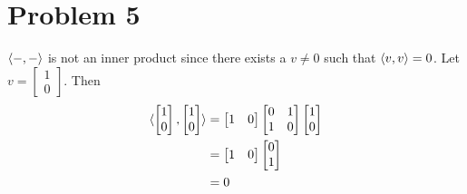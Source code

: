 \section*{Problem 5}
$\langle -, - \rangle$ is not an inner product since 
there exists a $v \neq 0$ such that $\langle v, v \rangle = 0$.
Let $v = \begin{bmatrix} 1 \\ 0 \end{bmatrix}$.
Then 
\begin{align*} 
    \langle \begin{bmatrix} 1 \\ 0 \end{bmatrix}, \begin{bmatrix} 1 \\ 0 \end{bmatrix} \rangle
    &= \begin{bmatrix} 1 & 0 \end{bmatrix}
        \begin{bmatrix} 
            0 & 1 \\
            1 & 0
        \end{bmatrix}
        \begin{bmatrix} 1 \\ 0 \end{bmatrix}\\
    &= \begin{bmatrix} 1 & 0 \end{bmatrix}
        \begin{bmatrix} 0 \\ 1 \end{bmatrix}\\
    &= 0
\end{align*}
